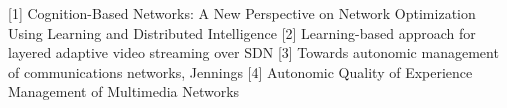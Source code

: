 [1] Cognition-Based Networks: A New Perspective on Network Optimization Using Learning and Distributed Intelligence
[2]  Learning-based approach for layered adaptive video streaming over SDN
[3] Towards autonomic management of communications networks, Jennings 
[4] Autonomic Quality of Experience Management of Multimedia Networks
